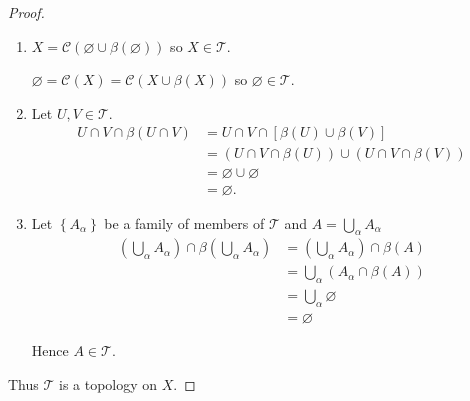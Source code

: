 \begin{proof}
	\begin{enumerate}[label={(\roman*)}]
		\item \( X = \mathscr{C}(\varnothing \cup \beta(\varnothing)) \) so \( X \in \mathscr{T} \).

		      \( \varnothing = \mathscr{C}(X) = \mathscr{C}(X \cup \beta(X)) \) so \( \varnothing \in \mathscr{T} \).
		\item Let \( U, V \in \mathscr{T} \).
		      \begingroup
		      \allowdisplaybreaks%
		      \begin{align*}
			      U \cap V \cap \beta(U \cap V) & = U \cap V \cap \left[\beta(U) \cup \beta(V)\right]      \\
			                                    & = (U \cap V \cap \beta(U)) \cup (U \cap V \cap \beta(V)) \\
			                                    & = \varnothing \cup \varnothing                           \\
			                                    & = \varnothing.
		      \end{align*}
		      \endgroup
		\item Let \( \left\{ A_{\alpha} \right\} \) be a family of members of \( \mathscr{T} \) and \( A = \bigcup_{\alpha} A_{\alpha} \)
		      \begingroup
		      \allowdisplaybreaks%
		      \begin{align*}
			      \left(\bigcup_{\alpha} A_{\alpha}\right) \cap \beta\left(\bigcup_{\alpha} A_{\alpha}\right) & = \left(\bigcup_{\alpha} A_{\alpha}\right) \cap \beta(A) \\
			                                                                                                  & = \bigcup_{\alpha} (A_{\alpha} \cap \beta(A))            \\
			                                                                                                  & = \bigcup_{\alpha} \varnothing                           \\
			                                                                                                  & = \varnothing
		      \end{align*}
		      \endgroup

		      Hence \( A \in \mathscr{T} \).
	\end{enumerate}

	Thus \( \mathscr{T} \) is a topology on \(X\).


\end{proof}
